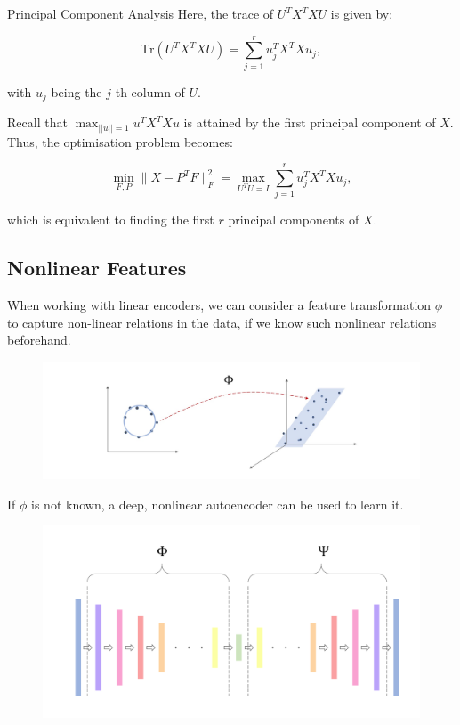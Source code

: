 \begin{theorembox}{Principal Component Analysis}
Here, the trace of \( U^T X^T X U \) is given by:

\begin{equation}
\text{Tr}(U^T X^T X U) = \sum_{j=1}^{r} u_j^T X^T X u_j,
\end{equation}


with \( u_j \) being the \( j \)-th column of \( U \).

Recall that \( \max_{||u||=1}u^T X^T X u \)  is attained by the first principal component of \( X \). Thus, the optimisation problem becomes:

\begin{equation}
\min_{F,P} \|X - P^T F\|_F^2 = \max_{U^T U = I} \sum_{j=1}^{r} u_j^T X^T X u_j,
\end{equation}

which is equivalent to finding the first \( r \) principal components of \( X \).


    
\end{theorembox}

\subsection{Nonlinear Features}
When working with linear encoders, we can consider a feature transformation $\phi$ to capture non-linear relations in the data, if we know such nonlinear relations beforehand. 

\begin{figure}[H]
    \centering
    \includegraphics[width=0.5\linewidth]{img/PCA_transform.png}
\end{figure}

If $\phi$ is not known, a deep, nonlinear autoencoder can be used to learn it.

\begin{figure}[H]
    \centering
    \includegraphics[width=0.5\linewidth]{img/d_nonlinear_autoencoder.png}
    
    
\end{figure}